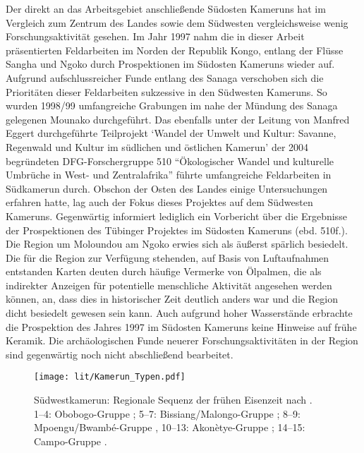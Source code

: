 Der direkt an das Arbeitsgebiet anschließende Südosten Kameruns hat im Vergleich zum Zentrum des Landes sowie dem Südwesten vergleichsweise wenig Forschungsaktivität gesehen. Im Jahr 1997 nahm \textcite{Eggert.2002} die in dieser Arbeit präsentierten Feldarbeiten im Norden der Republik Kongo, entlang der Flüsse Sangha und Ngoko durch Prospektionen im Südosten Kameruns wieder auf. Aufgrund aufschlussreicher Funde entlang des Sanaga verschoben sich die Prioritäten dieser Feldarbeiten sukzessive in den Südwesten Kameruns. So wurden 1998/99 umfangreiche Grabungen im nahe der Mündung des Sanaga gelegenen Mounako durchgeführt. Das ebenfalls unter der Leitung von Manfred Eggert durchgeführte Teilprojekt \enquote*{Wandel der Umwelt und Kultur: Savanne, Regenwald und Kultur im südlichen und östlichen Kamerun} der 2004 begründeten DFG-Forschergruppe 510 \enquote{Ökologischer Wandel und kulturelle Umbrüche in West- und Zentralafrika} führte umfangreiche Feldarbeiten in Südkamerun durch. Obschon der Osten des Landes einige Untersuchungen erfahren hatte, lag auch der Fokus dieses Projektes auf dem Südwesten Kameruns. Gegenwärtig informiert lediglich ein Vorbericht über die Ergebnisse der Prospektionen des Tübinger Projektes im Südosten Kameruns (ebd. 510f.). Die Region um Moloundou am Ngoko erwies sich als äußerst spärlich besiedelt. Die für die Region zur Verfügung stehenden, auf Basis von Luftaufnahmen entstanden Karten deuten durch häufige Vermerke von Ölpalmen, die als indirekter Anzeigen für potentielle menschliche Aktivität angesehen werden können, an, dass dies in historischer Zeit deutlich anders war und die Region dicht besiedelt gewesen sein kann. Auch aufgrund hoher Wasserstände erbrachte die Prospektion des Jahres 1997 im Südosten Kameruns keine Hinweise auf frühe Keramik. Die archäologischen Funde neuerer Forschungsaktivitäten in der Region \parencite{MorinRivat.2014} sind gegenwärtig noch nicht abschließend bearbeitet.

\begin{figure*}[p]
	\centering
	\texttt{[image: lit/Kamerun\_Typen.pdf]}
	\caption{Südwestkamerun: Regionale Sequenz der frühen Eisenzeit nach \textcites{GouemGouem.20102011}{NlendNlend.20132014}.\\{\footnotesize 1--4: Obobogo-Gruppe \parencites[Taf. 25.1--2, 37.1, 39.2]{Claes.1985}[632 Abb.~43.4]{deMaret.2013}; 5--7: Bissiang/Malongo-Gruppe \parencites[34 Abb.~14]{Oslisly.2001c}[282 Abb.~3.2, 287 Abb.~7.3]{Eggert.2006b}; 8--9: Mpoengu/Bwambé-Gruppe \parencites[282 Abb.~3.7]{Eggert.2006b}[252 Abb.~114.2]{NlendNlend.20132014}, 10--13: Akonètye-Gruppe \parencite[195 Abb.~10.2--5]{Meister.2008b}; 14--15: Campo-Gruppe \parencite[98 Abb.~5.6, 182 Taf.~12.2, 184 Taf.~14.4]{Eggert.2016}.}}
	\label{fig:swCameroon_Sequence}
\end{figure*}

